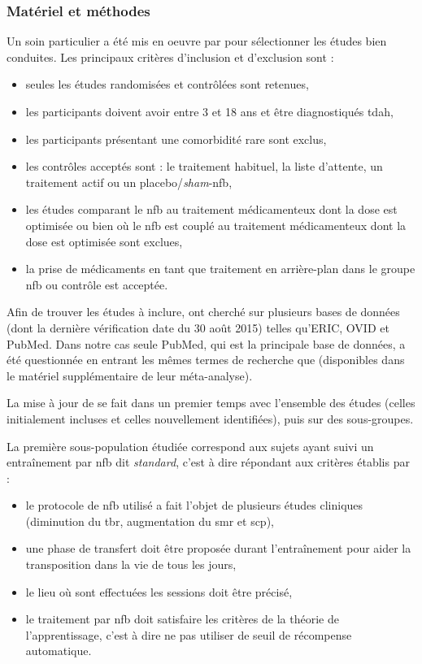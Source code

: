 \subsubsection{Matériel et méthodes}
Un soin particulier a été mis en oeuvre par \citet{Cortese2016} pour sélectionner les études bien conduites. Les principaux critères d'inclusion
et d'exclusion sont \citep{Cortese2016} :
\begin{itemize}
\item seules les études randomisées et contrôlées sont retenues,
\item les participants doivent avoir entre 3 et 18 ans et être diagnostiqués \gls{tdah},
\item les participants présentant une comorbidité rare sont exclus,
\item les contrôles acceptés sont : le traitement habituel, la liste d'attente, un traitement actif ou un placebo/\textit{sham}-\gls{nfb},
\item les études comparant le \gls{nfb} au traitement médicamenteux dont la dose est optimisée ou bien où le \gls{nfb} est couplé au traitement médicamenteux
dont la dose est optimisée sont exclues,
\item la prise de médicaments en tant que traitement en arrière-plan dans le groupe \gls{nfb} ou contrôle est acceptée.
\end{itemize}

Afin de trouver les études à inclure, \citet{Cortese2016} ont cherché sur plusieurs bases de données (dont la dernière vérification
date du 30 août 2015) telles qu'ERIC, OVID et PubMed. Dans notre cas seule PubMed, qui est la principale base de données, a été questionnée en entrant 
les mêmes termes de recherche que \citet{Cortese2016} (disponibles dans le matériel supplémentaire de leur méta-analyse).

La mise à jour de \citet{Cortese2016} se fait dans un premier temps avec l'ensemble des études (celles initialement incluses et celles nouvellement
identifiées), puis sur des sous-groupes.

La première sous-population étudiée correspond aux sujets ayant suivi un entraînement par \gls{nfb} dit \emph{standard}, c'est à dire répondant aux critères 
établis par \citet{Arns2014} :
\begin{itemize}
\item le protocole de \gls{nfb} utilisé a fait l'objet de plusieurs études cliniques (diminution du \gls{tbr}, augmentation du \gls{smr} et \gls{scp}),
\item une phase de transfert doit être proposée durant l'entraînement pour aider la transposition dans la vie de tous les jours,
\item le lieu où sont effectuées les sessions doit être précisé,
\item le traitement par \gls{nfb} doit satisfaire les critères de la théorie de l'apprentissage, c'est à dire ne pas utiliser de seuil de récompense automatique.
\end{itemize}

